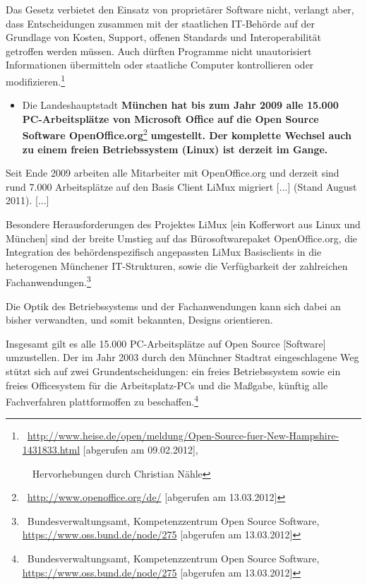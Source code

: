\documentclass[a4paper]{article}
\newcommand\liststyleWWviiiNumiii{%
\renewcommand\theenumi{\arabic{enumi}}
\renewcommand\theenumii{\arabic{enumii}}
\renewcommand\theenumiii{\arabic{enumiii}}
\renewcommand\labelitemi{{}-}
\renewcommand\labelenumi{\theenumi.}
\renewcommand\labelenumii{\theenumii.}
\renewcommand\labelenumiii{\theenumiii.}
}
\begin{document}
{
Das Gesetz verbietet den Einsatz von propriet\"arer Software nicht,
verlangt aber, dass Entscheidungen zusammen mit der staatlichen
IT-Beh\"orde auf der Grundlage von Kosten, Support, offenen Standards
und Interoperabilit\"at getroffen werden m\"ussen. Auch d\"urften
Programme nicht unautorisiert Informationen \"ubermitteln oder
staatliche Computer kontrollieren oder
modifizieren.{\guillemotleft}\footnote{\ \url{http://www.heise.de/open/meldung/Open-Source-fuer-New-Hampshire-1431833.html}
[abgerufen am 09.02.2012],\par \ \ Hervorhebungen durch Christian
N\"ahle}}


\bigskip

\liststyleWWviiiNumiii
\begin{itemize}
\item {
Die Landeshauptstadt \textbf{M\"unchen hat bis zum Jahr 2009 alle 15.000
PC-Arbeitspl\"atze von Microsoft Office auf die Open Source Software
OpenOffice.org}\footnote{\ \url{http://www.openoffice.org/de/}
[abgerufen am 13.03.2012]}\textbf{ umgestellt. Der komplette Wechsel
auch zu einem freien Betriebssystem (Linux) ist derzeit im Gange.}}
\end{itemize}
{
{\guillemotright}Seit Ende 2009 arbeiten alle Mitarbeiter mit
OpenOffice.org und derzeit sind rund 7.000 Arbeitspl\"atze auf den
Basis Client LiMux migriert [...] (Stand August 2011). [...]}

{
Besondere Herausforderungen des Projektes LiMux [ein Kofferwort aus
Linux und M\"unchen] sind der breite Umstieg auf das
B\"urosoftwarepaket OpenOffice.org, die Integration des
beh\"ordenspezifisch angepassten LiMux Basisclients in die heterogenen
M\"unchener IT-Strukturen, sowie die Verf\"ugbarkeit der zahlreichen
Fachanwendungen.{\guillemotleft}\footnote{\ Bundesverwaltungsamt,
Kompetenzzentrum Open Source Software,
\url{https://www.oss.bund.de/node/275} [abgerufen am 13.03.2012]}}

{
Die Optik des Betriebssystems und der Fachanwendungen kann sich dabei an
bisher verwandten, und somit bekannten, Designs orientieren.}

{
Insgesamt gilt es {\guillemotright}alle 15.000 PC-Arbeitspl\"atze auf
Open Source [Software] umzustellen. Der im Jahr 2003 durch den
M\"unchner Stadtrat eingeschlagene Weg st\"utzt sich auf zwei
Grundentscheidungen: ein freies Betriebssystem sowie ein freies
Officesystem f\"ur die Arbeitsplatz-PCs und die Ma{\ss}gabe, k\"unftig
alle Fachverfahren plattformoffen zu
beschaffen.{\guillemotleft}\footnote{\ Bundesverwaltungsamt,
Kompetenzzentrum Open Source Software,
\url{https://www.oss.bund.de/node/275} [abgerufen am 13.03.2012]}}
\end{document}
